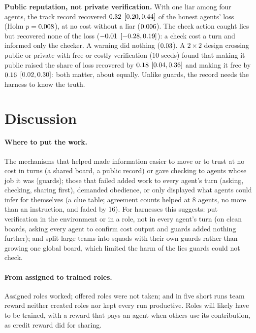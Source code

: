\documentclass{article}
\begin{document}
\textbf{Public reputation, not private verification.} With one liar among four agents, the track record recovered $0.32$ $[0.20, 0.44]$ of the honest agents' loss (Holm $p = 0.008$), at no cost without a liar ($0.006$). The check action caught lies but recovered none of the loss ($-0.01$ $[-0.28, 0.19]$): a check cost a turn and informed only the checker. A warning did nothing ($0.03$). A $2 \times 2$ design crossing public or private with free or costly verification (10 seeds) found that making it public raised the share of loss recovered by $0.18$ $[0.04, 0.36]$ and making it free by $0.16$ $[0.02, 0.30]$: both matter, about equally. Unlike guards, the record needs the harness to know the truth.

\section{Discussion}

\paragraph{Where to put the work.} The mechanisms that helped made information easier to move or to trust at no cost in turns (a shared board, a public record) or gave checking to agents whose job it was (guards); those that failed added work to every agent's turn (asking, checking, sharing first), demanded obedience, or only displayed what agents could infer for themselves (a clue table; agreement counts helped at 8 agents, no more than an instruction, and faded by 16). For harnesses this suggests: put verification in the environment or in a role, not in every agent's turn (on clean boards, asking every agent to confirm cost output and guards added nothing further); and split large teams into squads with their own guards rather than growing one global board, which limited the harm of the lies guards could not check.

\paragraph{From assigned to trained roles.} Assigned roles worked; offered roles were not taken; and in five short runs team reward neither created roles nor kept every run productive. Roles will likely have to be trained, with a reward that pays an agent when others use its contribution, as credit reward did for sharing.
\end{document}
